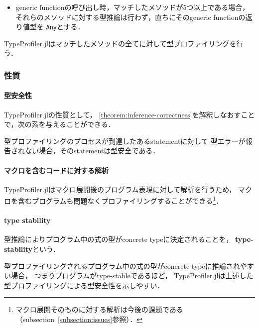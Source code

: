 \begin{itemize}
  \item generic functionの呼び出し時，マッチしたメソッドが5つ以上である場合，
        それらのメソッドに対する型推論は行わず，直ちにそのgeneric functionの返り値型を
        \verb|Any|とする．
\end{itemize}

TypeProfiler.jlはマッチしたメソッドの全てに対して型プロファイリングを行う．

\subsubsection{性質} \label{subsubsection:type-profiler-property}

\paragraph{型安全性}

TypeProfiler.jlの性質として，
\ref{theorem:inference-correctness}を解釈しなおすことで，次の系を与えることができる．

\begin{corollary*}[型プロファイリングによる型安全性]
  \label{corollary:type-profiler-type-safety}
  型プロファイリングのプロセスが到達したあるstatementに対して
  型エラーが報告されない場合，そのstatementは型安全である．
\end{corollary*}

\paragraph{マクロを含むコードに対する解析}

TypeProfiler.jlはマクロ展開後のプログラム表現に対して解析を行うため，
マクロを含むプログラムも問題なくプロファイリングすることができる\footnote{
  マクロ展開そのものに対する解析は今後の課題である（subsection~\ref{subsection:issues}参照）．
}．

\paragraph*{type stability}

型推論によりプログラム中の式の型がconcrete typeに決定されることを，
\textbf{type-stability}\cite{type-stability}という．

型プロファイリングされるプログラム中の式の型がconcrete typeに推論されやすい場合，
つまりプログラムがtype-stableであるほど，
TypeProfiler.jlは上述した型プロファイリングによる型安全性を示しやすい．

